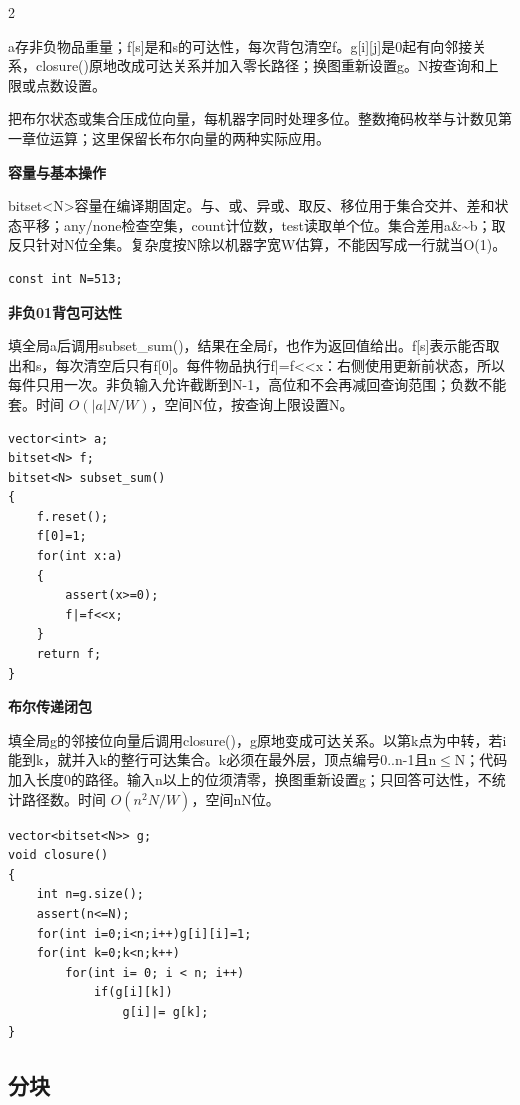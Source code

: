 \documentclass[UTF8,fontset=fandol,a4paper,twoside]{ctexart}
\newcommand{\topic}[1]{\par\smallskip\textbf{#1}\par\nobreak}
\newcommand{\note}[1]{{\fontsize{10}{12}\selectfont #1\par}}
\begin{document}
\begin{multicols}{2}
\note{a存非负物品重量；f[\allowbreak{}s]\allowbreak{}是和s的可达性，每次背包清空f。g[\allowbreak{}i]\allowbreak{}[\allowbreak{}j]\allowbreak{}是0起有向邻接关系，closure(\allowbreak{})\allowbreak{}原地改成可达关系并加入零长路径；换图重新设置g。N按查询和上限或点数设置。}
\note{把布尔状态或集合压成位向量，每机器字同时处理多位。整数掩码枚举与计数见第一章位运算；这里保留长布尔向量的两种实际应用。}
\topic{容量与基本操作}
\note{bitset<\allowbreak{}N>\allowbreak{}容量在编译期固定。与、或、异或、取反、移位用于集合交并、差和状态平移；any/\allowbreak{}none检查空集，count计位数，test读取单个位。集合差用a\&\textasciitilde{}b；取反只针对N位全集。复杂度按N除以机器字宽W估算，不能因写成一行就当O(\allowbreak{}1)\allowbreak{}。}
\begin{lstlisting}
const int N=513;
\end{lstlisting}
\topic{非负01背包可达性}
\note{填全局a后调用subset\_sum(\allowbreak{})\allowbreak{}，结果在全局f，也作为返回值给出。f[\allowbreak{}s]\allowbreak{}表示能否取出和s，每次清空后只有f[\allowbreak{}0]\allowbreak{}。每件物品执行f|=\allowbreak{}f<\allowbreak{}<\allowbreak{}x：右侧使用更新前状态，所以每件只用一次。非负输入允许截断到N-\allowbreak{}1，高位和不会再减回查询范围；负数不能套。时间 $O(|a|N/W)$，空间N位，按查询上限设置N。}
\begin{lstlisting}
vector<int> a;
bitset<N> f;
bitset<N> subset_sum()
{
    f.reset();
    f[0]=1;
    for(int x:a)
    {
        assert(x>=0);
        f|=f<<x;
    }
    return f;
}
\end{lstlisting}
\topic{布尔传递闭包}
\note{填全局g的邻接位向量后调用closure(\allowbreak{})\allowbreak{}，g原地变成可达关系。以第k点为中转，若i能到k，就并入k的整行可达集合。k必须在最外层，顶点编号0.\allowbreak{}.\allowbreak{}n-\allowbreak{}1且n\ensuremath{\le}N；代码加入长度0的路径。输入n以上的位须清零，换图重新设置g；只回答可达性，不统计路径数。时间 $O(n^2N/W)$，空间nN位。}
\begin{lstlisting}
vector<bitset<N>> g;
void closure()
{
    int n=g.size();
    assert(n<=N);
    for(int i=0;i<n;i++)g[i][i]=1;
    for(int k=0;k<n;k++)
        for(int i= 0; i < n; i++)
            if(g[i][k])
                g[i]|= g[k];
}
\end{lstlisting}
\subsection{分块}


\end{multicols}
\end{document}

